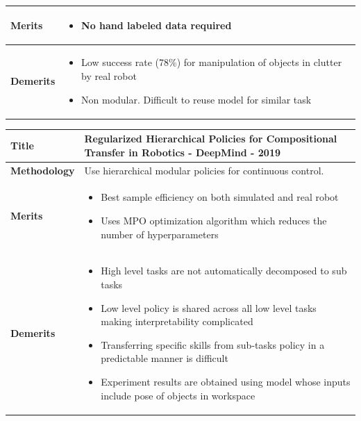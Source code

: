 \documentclass{beamer}
\begin{document}
\begin{frame}[allowframebreaks]
\begin{tabular}{m{2.25cm} | m{9cm}}
			\textbf{Merits} &
			\begin{itemize}
				\item No hand labeled data required
			\end{itemize} \\
			\hline
			
			\textbf{Demerits} &
			\begin{itemize}
				\item Low success rate (78\%) for manipulation of objects in clutter by real robot
				\item Non modular. Difficult to reuse model for similar task
			\end{itemize}\\
			\hline
			
		\end{tabular}
	
		\begin{tabular}{m{2.25cm} | m{9cm}}
			\hline
			
			\textbf{Title} &
			Regularized Hierarchical Policies for Compositional Transfer in Robotics \cite{rhpo} - DeepMind - 2019\\
			\hline
			
			\textbf{Methodology} &
			Use hierarchical modular policies for continuous control. \\
			\hline
			
			\textbf{Merits} &
			\begin{itemize}
				\item Best sample efficiency on both simulated and real robot
				\item Uses MPO optimization algorithm which reduces the number of hyperparameters
			\end{itemize} \\
			\hline
			
			\textbf{Demerits} &
			\begin{itemize}
				\item High level tasks are not automatically decomposed to sub tasks
				\item Low level policy is shared across all low level tasks making interpretability complicated
				\item Transferring specific skills from sub-tasks policy in a predictable manner is difficult
				\item Experiment results are obtained using model whose inputs include pose of objects in workspace
			\end{itemize}\\
			\hline
			
		\end{tabular}
	\end{frame}
	
\end{document}
